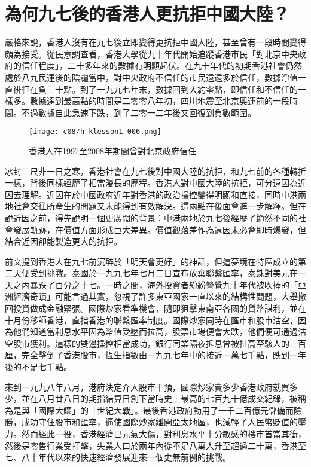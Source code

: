 \section{為何九七後的香港人更抗拒中國大陸？}

嚴格來說，香港人沒有在九七後立即變得更抗拒中國大陸，甚至曾有一段時間變得頗為接受。從民意調查看，香港大學從九十年代開始追蹤香港市民「對北京中央政府的信任程度」，二十多年來的數據有明顯起伏。在九十年代的初期香港社會仍然處於八九民運後的陰霾當中，對中央政府不信任的市民遠遠多於信任，數據淨值一直徘徊在負三十點。到了一九九七年末，數據回到大約零點，即信任和不信任的一樣多。數據達到最高點的時間是二零零八年初，四川地震至北京奧運前的一段時間。不過數據自此急速下跌，到了二零一二年後又回復到負數範圍。

\begin{figure}[htbp]
    \centering
    \texttt{[image: c08/h-klesson1-006.png]}
    \caption{香港人在1997至2008年期間曾對北京政府信任} 
\end{figure}

冰封三尺非一日之寒，香港社會在九七後對中國大陸的抗拒，和九七前的各種轉折一樣，背後同樣經歷了相當漫長的歷程。香港人對中國大陸的抗拒，可分遠因為近因去理解。近因在於中國政府近年對香港的政治操控變得明顯和直接，同時中港兩地社會交往所產生的問題又未能得到有效解決。這兩點在後面會進一步解釋。但在說近因之前，得先說明一個更廣闊的背景：中港兩地於九七後經歷了節然不同的社會發展軌跡，在價值方面形成巨大差異。價值觀落差作為遠因未必會即時爆發，但結合近因卻能製造更大的抗拒。

前文提到香港人在九七前沉醉於「明天會更好」的神話，但這夢境在特區成立的第二天便受到挑戰。泰國於一九九七年七月二日宣布放棄聯繫匯率，泰銖對美元在一天之內暴跌了百分之十七。一時之間，海外投資者紛紛警覺九十年代被吹捧的「亞洲經濟奇蹟」可能言過其實，忽視了許多東亞國家一直以來的結構性問題，大舉撤回投資做成金融緊張。國際炒家看準機會，隨即狙擊東南亞各國的貨幣謀利，並在十月份移師香港，直指香港的聯繫匯率制度。國際炒家同時在匯市和股市沽空，因為他們知道當利息水平因為幣值受壓而拉高，股票市場便會大跌，他們便可通過沽空股市獲利。這樣的雙邊操控相當成功，銀行同業隔夜拆息曾被扯高至駭人的三百厘，完全擊倒了香港股市，恆生指數由一九九七年中的接近一萬七千點，跌到一年後的不足七千點。

來到一九九八年八月，港府決定介入股市干預，國際炒家賣多少香港政府就買多少，並在八月廿八日的期指結算日創下當時史上最高的七百九十億成交紀錄，被稱為是與「國際大鱷」的「世紀大戰」。最後香港政府動用了一千二百億元儲備而險勝，成功守住股市和匯率，逼使國際炒家離開亞太地區，也減輕了人民幣貶值的壓力。然而經此一役，香港經濟已元氣大傷，對利息水平十分敏感的樓市首當其衝，然後是零售行業受打擊，失業人口於兩年內從不足八萬人升至超過二十萬，香港至七、八十年代以來的快速經濟發展迎來一個史無前例的挑戰。

